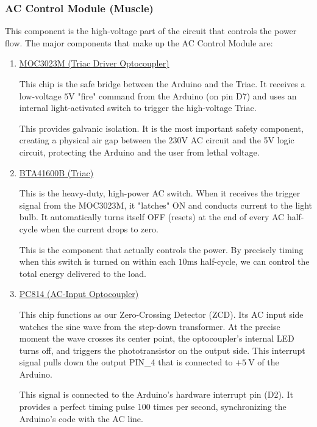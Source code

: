 \documentclass[11pt]{article}
\begin{document}
\subsubsection{AC Control Module (Muscle)}
This component is the  high-voltage part of the circuit that controls the power flow. The major components that make up the AC Control Module are:
\begin{enumerate}
	\item \underline{MOC3023M (Triac Driver Optocoupler)}

		This chip is the safe bridge between the Arduino and the Triac. It receives a low-voltage $5\si{\volt}$ "fire" command from the Arduino (on pin D7) and uses an internal light-activated switch to trigger the high-voltage Triac.
		
		This provides galvanic isolation. It is the most important safety component, creating a physical air gap between the $230\si{\volt}$ AC circuit and the 5V logic circuit, protecting the Arduino and the user from lethal voltage.
	
	\item \underline{BTA41600B (Triac)}

		This is the heavy-duty, high-power AC switch. When it receives the trigger signal from the MOC3023M, it "latches" ON and conducts current to the light bulb. It automatically turns itself OFF (resets) at the end of every AC half-cycle when the current drops to zero.

		This is the component that actually controls the power. By precisely timing when this switch is turned on within each $10\si{\milli\second}$ half-cycle, we can control the total energy delivered to the load.

	\item \underline{PC814 (AC-Input Optocoupler)}

		This chip functions as our Zero-Crossing Detector (ZCD). Its AC input side watches the sine wave from the step-down transformer. At the precise moment the wave crosses its center point, the optocoupler's internal LED turns off, and triggers the phototransistor on the output side. This interrupt signal pulls down the output PIN\_4 that is connected to $+\SI{5}{\volt}$ of the Arduino.

		This signal is connected to the Arduino's hardware interrupt pin (D2). It provides a perfect timing pulse 100 times per second, synchronizing the Arduino's code with the AC line.	
\end{enumerate}
\end{document}
